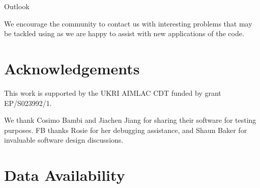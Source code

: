 \documentclass[fleqn,usenatbib]{mnras}
\begin{document}
Outlook

We encourage the community to contact us with interesting problems that may be tackled using \Gradus as we are happy to assist with new applications of the code.


\section*{Acknowledgements}
This work is supported by the UKRI AIMLAC CDT funded by grant EP/S023992/1.

We thank Cosimo Bambi and Jiachen Jiang for sharing their software for testing purposes. FB thanks Rosie for her debugging assistance, and Shaun Baker for invaluable software design discussions.


\section*{Data Availability}









\appendix








\bsp	%
\label{lastpage}
\end{document}
